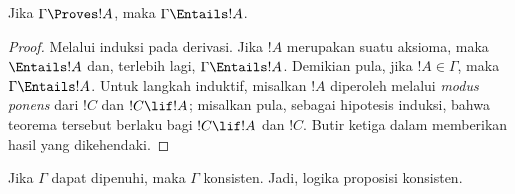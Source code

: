\documentclass[../../../include/open-logic-section]{subfiles}
\begin{document}


\begin{thm}[Kesahihan]
Jika $\Gamma\Proves!A$, maka
$\Gamma \Entails !A$.
\end{thm}

\begin{proof}
Melalui induksi pada derivasi. Jika $!A$ merupakan suatu aksioma, maka
$\Entails !A$ dan, terlebih lagi, $\Gamma \Entails!A$. Demikian pula, jika
$!A \in \Gamma$, maka $\Gamma \Entails!A$. Untuk langkah induktif, misalkan
$!A$ diperoleh melalui \emph{modus ponens} dari $!C$ dan $!C\lif!A$; misalkan
pula, sebagai hipotesis induksi, bahwa teorema tersebut berlaku bagi
$!C\lif !A$ dan $!C$. Butir ketiga dalam
 memberikan hasil yang dikehendaki.
\end{proof}

\begin{cor}
Jika $\Gamma$ dapat dipenuhi, maka $\Gamma$ konsisten. Jadi, logika proposisi
konsisten.
\end{cor}
\end{document}
